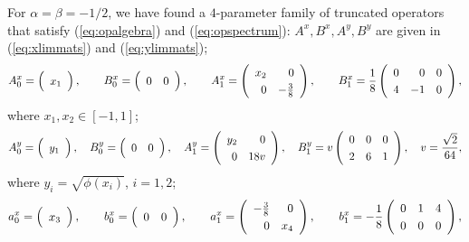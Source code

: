 \documentclass[12pt,a4paper]{article}
\begin{document}
For $\alpha = \beta = -1/2$, we have found a $4$-parameter family of truncated operators that satisfy (\ref{eq:opalgebra}) and (\ref{eq:opspectrum}): $A^x, B^x, A^y, B^y$ are given in (\ref{eq:xlimmats}) and (\ref{eq:ylimmats});
\begin{equation*}
A_0^x = 
\left(
\begin{array}{c}
x_1
\end{array}
\right), \qquad
B_0^x = 
\left(
\begin{array}{c c}
0 & 0
\end{array}
\right), \qquad
A_1^x = 
\left(
\renewcommand{\arraystretch}{1.25}
\begin{array}{r r}
x_2 & 0 \\
0 & -\frac{3}{8}
\end{array}
\right), \qquad
B_1^x = 
\frac{1}{8}\left(
\renewcommand{\arraystretch}{1.25}
\begin{array}{r r r}
0 & 0 & 0 \\
4 & -1 & 0
\end{array}
\right),
\end{equation*}
where $x_1, x_2 \in [-1, 1]$;
\begin{equation*}
A_0^y = 
\left(
\begin{array}{c}
y_1
\end{array}
\right), \quad
B_0^y = 
\left(
\begin{array}{c c}
0 & 0
\end{array}
\right), \quad
A_1^y = 
\left(
\renewcommand{\arraystretch}{1.25}
\begin{array}{r r}
y_2 & 0 \\
0 & 18v
\end{array}
\right), \quad
B_1^y = 
v\left(
\renewcommand{\arraystretch}{1.25}
\begin{array}{r r r}
0 & 0 & 0 \\
2 & 6 & 1
\end{array}
\right), \quad v = \frac{\sqrt{2}}{64},
\end{equation*}
where $y_i = \sqrt{\phi(x_i)}$, $i = 1, 2$; 
\begin{equation*}
a_0^x = 
\left(
\begin{array}{c}
x_3
\end{array}
\right), \qquad
b_0^x = 
\left(
\begin{array}{c c}
0 & 0
\end{array}
\right), \qquad
a_1^x = 
\left(
\renewcommand{\arraystretch}{1.25}
\begin{array}{r r}
-\frac{3}{8} & 0 \\
0 & x_4
\end{array}
\right), \qquad
b_1^x = 
-\frac{1}{8}\left(
\renewcommand{\arraystretch}{1.25}
\begin{array}{r r r}
0 & 1 & 4 \\
0 & 0 & 0
\end{array}
\right),
\end{equation*}
\end{document}
